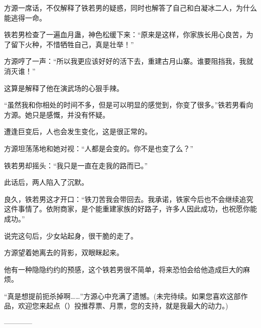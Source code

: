 \begin{this_body}
方源一席话，不仅解释了铁若男的疑惑，同时也解答了自己和白凝冰二人，为什么能逃得一命。

铁若男检查了一遍血月蛊，神色松缓下来：“原来是这样，你家族长用心良苦，为了留下火种，不惜牺牲自己，真是壮举！”

方源哼了一声：“所以我更应该好好的活下去，重建古月山寨。谁要阻挡我，我就消灭谁！”

这算是解释了他在演武场的心狠手辣。

“虽然我和你相处的时间不多，但是可以明显的感觉到，你变了很多。”铁若男看向方源。她只是感慨，并没有怀疑。

遭逢巨变后，人也会发生变化，这是很正常的。

方源坦荡荡地和她对视：“人都是会变的。你不是也变了么？”

铁若男却摇头：“我只是一直在走我的路而已。”

此话后，两人陷入了沉默。

良久，铁若男这才开口：“铁刀苦我会带回去。我承诺，铁家今后也不会继续追究这件事情了。依附商家，是个能重建家族的好路子，许多人因此成功，也祝愿你能成功。”

说完这句后，少女站起身，很干脆的走了。

方源望着她离去的背影，双眼眯起来。

他有一种隐隐约约的预感，这个铁若男很不简单，将来恐怕会给他造成巨大的麻烦。

“真是想提前扼杀掉啊……”方源心中充满了遗憾。(未完待续。如果您喜欢这部作品，欢迎您来起点（）投推荐票、月票，您的支持，就是我最大的动力。)

------------

\end{this_body}

